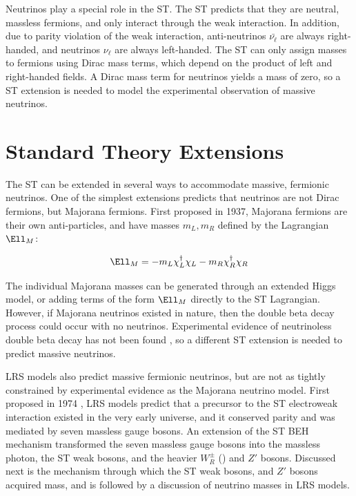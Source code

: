 Neutrinos play a special role in the ST.  The ST predicts that they are neutral, massless fermions, and only interact 
through the weak interaction.  In addition, due to parity violation of the weak interaction, 
anti-neutrinos $\bar{\nu_{\ell}}$ are always right-handed, and neutrinos $\nu_{\ell}$ are always left-handed.  
The ST can only assign masses to fermions using Dirac mass terms, which depend on the product of left and 
right-handed fields.  A Dirac mass term for neutrinos yields a mass of zero, so a ST extension is needed 
to model the experimental observation of massive neutrinos.


\section{Standard Theory Extensions}
\label{sec:lrsExtensions}
The ST can be extended in several ways to accommodate massive, fermionic neutrinos.  One of the simplest 
extensions predicts that neutrinos are not Dirac fermions, but Majorana fermions.  First proposed\cite{majoranaTheory} 
in 1937, Majorana fermions are their own anti-particles, and have masses $m_{L},m_{R}$ defined by the 
Lagrangian $\Ell_{M}$:

\begin{equation}
	\Ell_{M} = -m_{L}\chi^{\dagger}_{L}\chi_{L} - m_{R}\chi^{\dagger}_{R}\chi_{R}
\end{equation}

The individual Majorana masses can be generated through an extended Higgs model, or adding terms of the 
form $\Ell_{M}$ directly to the ST Lagrangian.  However, if Majorana neutrinos existed in nature, then 
the double beta decay process could occur with no neutrinos.  Experimental evidence of neutrinoless double 
beta decay has not been found \cite{igexDblBetaDecay,gerdaDblBetaDecay}, so a different ST extension is 
needed to predict massive neutrinos.

LRS models also predict massive fermionic neutrinos, but are not as tightly constrained by experimental 
evidence as the Majorana neutrino model.
First proposed in 1974 \cite{earlyLRSModel}, LRS models predict that a precursor to the ST electroweak 
interaction existed in the very early universe, and it conserved parity and was mediated by seven massless 
gauge bosons.  An extension of the ST BEH mechanism transformed the seven massless gauge bosons 
into the massless photon, the ST weak bosons, and the heavier $W^{\pm}_{R}$ (\WR) and $Z'$ bosons.  
Discussed next is the mechanism through which the ST weak bosons, \WR and $Z'$ bosons acquired mass, 
and is followed by a discussion of neutrino masses in LRS models.

